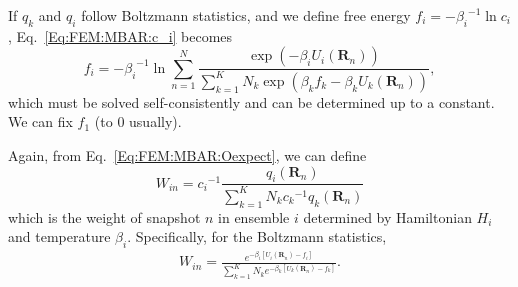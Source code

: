 If $q_k$ and $q_i$ follow Boltzmann statistics, and we define free energy $f_i=-{\beta_i}^{-1}\ln{c_i}$, Eq.~\ref{Eq:FEM:MBAR:c_i} becomes
\begin{equation}
f_i=-{\beta_i}^{-1}\ln{\sum\limits_{n=1}^N \frac{\exp{\left(-\beta_i U_i(\mathbf{R}_n)\right)}}{\sum_{k=1}^{K}N_k\exp{\left(\beta_kf_k-\beta_kU_k(\mathbf{R}_n)\right)}}},
\label{Eq:FEM:MBAR:f_i_final}
\end{equation}
which must be solved self-consistently and can be determined up to a constant. We can fix $f_1$ (to 0 usually). 

Again, from Eq.~\ref{Eq:FEM:MBAR:Oexpect}, we can define
\begin{equation}
W_{in}={c_i}^{-1}\frac{q_i(\mathbf{R}_n)}{\sum_{k=1}^{K}N_k{c_k}^{-1}q_k(\mathbf{R}_n)}
\end{equation}
which is the weight of snapshot $n$ in ensemble $i$ determined by Hamiltonian $H_i$ and temperature $\beta_i$. Specifically, for the Boltzmann statistics,
\begin{align}
W_{in}=\frac{e^{-\beta_i \left[U_i(\mathbf{R}_n)-f_i\right]}}{\sum_{k=1}^{K}N_k e^{-\beta_k \left[U_k(\mathbf{R}_n)-f_k\right]}}.
\end{align}

